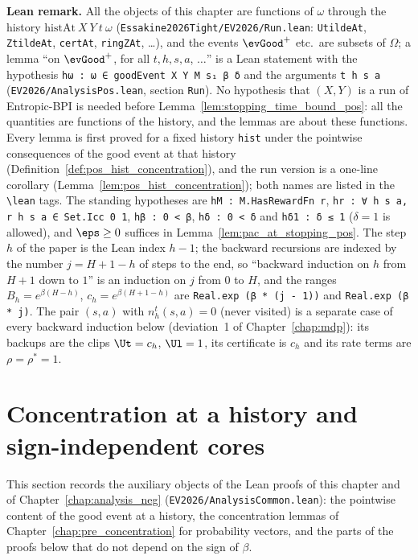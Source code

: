 \textbf{Lean remark.} All the objects of this chapter are functions of $\omega$ through the
history $\mathrm{histAt}\ X\ Y\ t\ \omega$ (\texttt{Essakine2026Tight/EV2026/Run.lean}:
\texttt{UtildeAt}, \texttt{ZtildeAt}, \texttt{certAt}, \texttt{ringZAt}, \ldots), and the
events $\evGood^+$ etc.\ are subsets of $\Omega$; a lemma ``on $\evGood^+$, for all $t, h, s, a$,
$\ldots$'' is a Lean statement with the hypothesis \texttt{hω : ω ∈ goodEvent X Y M s₁ β δ} and
the arguments \texttt{t h s a} (\texttt{EV2026/AnalysisPos.lean}, section \texttt{Run}). No hypothesis
that $(X, Y)$ is a run of Entropic-BPI is needed before Lemma~\ref{lem:stopping_time_bound_pos}: all the
quantities are functions of the history, and the lemmas are about these functions. Every lemma is
first proved for a fixed history \texttt{hist} under the pointwise consequences of the good event at
that history (Definition~\ref{def:pos_hist_concentration}), and the run version is a one-line
corollary (Lemma~\ref{lem:pos_hist_concentration}); both names are listed in the \texttt{\textbackslash lean}
tags. The standing hypotheses are \texttt{hM : M.HasRewardFn r}, \texttt{hr : ∀ h s a, r h s a ∈ Set.Icc 0 1},
\texttt{hβ : 0 < β}, \texttt{hδ : 0 < δ} and \texttt{hδ1 : δ ≤ 1} ($\delta = 1$ is allowed), and
$\eps \ge 0$ suffices in Lemma~\ref{lem:pac_at_stopping_pos}. The
step $h$ of the paper is the Lean index $h - 1$; the backward recursions are indexed by the
number $j = H + 1 - h$ of steps to the end, so ``backward induction on $h$ from $H + 1$ down to
$1$'' is an induction on $j$ from $0$ to $H$, and the ranges $B_h = e^{\beta(H-h)}$,
$c_h = e^{\beta(H+1-h)}$ are \texttt{Real.exp (β * (j - 1))} and \texttt{Real.exp (β * j)}.
The pair $(s, a)$ with $n_h^t(s,a) = 0$ (never visited) is a separate case of every
backward induction below (deviation~1 of Chapter~\ref{chap:mdp}): its backups are the clips
$\Ut = c_h$, $\Ul = 1$, its certificate is $c_h$ and its rate terms are $\rho = \rho^* = 1$.

\section{Concentration at a history and sign-independent cores}
\label{sec:pos_cores}

This section records the auxiliary objects of the Lean proofs of this chapter and of
Chapter~\ref{chap:analysis_neg} (\texttt{EV2026/AnalysisCommon.lean}): the pointwise content of the
good event at a history, the concentration lemmas of Chapter~\ref{chap:pre_concentration} for
probability vectors, and the parts of the proofs below that do not depend on the sign of $\beta$.

